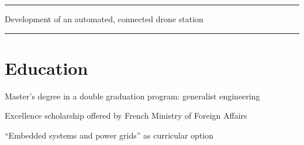 \documentclass[]{deedy-resume}
\begin{document}
\begin{minipage}[t]{0.66\textwidth}
\rule{8pt}{0ex}Development of an automated, connected drone station \\
\rule{8pt}{0ex}
\sectionsep







\section{Education}

\vspace{\topsep}
\begin{tightemize}\item Master's degree in a double graduation program: generalist engineering
\item Excellence scholarship offered by French Ministry of Foreign Affairs
\item ``Embedded systems and power grids'' as curricular option
\end{tightemize}
\sectionsep


\end{minipage}
\end{document}
